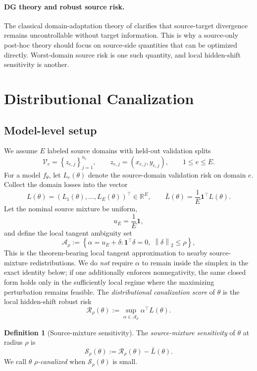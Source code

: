 \documentclass{article}
\theoremstyle{definition}
\newtheorem{definition}[theorem]{Definition}
\newcommand{\RR}{\mathbb{R}}
\newcommand{\cA}{\mathcal{A}}
\newcommand{\cV}{\mathcal{V}}
\newcommand{\one}{\mathbf{1}}
\newcommand{\norm}[1]{\left\lVert #1 \right\rVert}
\newcommand{\paren}[1]{\left( #1 \right)}
\newcommand{\braces}[1]{\left\{ #1 \right\}}
\newcommand{\ub}{u_E}
\begin{document}
\paragraph{DG theory and robust source risk.}
The classical domain-adaptation theory of \citet{ben2010theory} clarifies that source-target divergence remains uncontrollable without target information. This is why a source-only post-hoc theory should focus on source-side quantities that can be optimized directly. Worst-domain source risk is one such quantity, and local hidden-shift sensitivity is another.

\section{Distributional Canalization}
\label{sec:canalization}

\subsection{Model-level setup}

We assume \(E\) labeled source domains with held-out validation splits
\[
\cV_e = \braces{z_{e,j}}_{j=1}^{n_e},
\qquad
z_{e,j}=(x_{e,j}, y_{e,j}),
\qquad
1 \le e \le E.
\]
For a model \(f_\theta\), let \(L_e(\theta)\) denote the source-domain validation risk on domain \(e\). Collect the domain losses into the vector
\[
L(\theta) = \paren{L_1(\theta),\dots,L_E(\theta)}^\top \in \RR^E,
\qquad
\bar L(\theta)=\frac{1}{E}\one^\top L(\theta).
\]
Let the nominal source mixture be uniform,
\[
\ub = \frac{1}{E}\one,
\]
and define the local tangent ambiguity set
\begin{equation}
\cA_\rho
:=
\braces{
\alpha=\ub+\delta :
\one^\top\delta=0,
\;
\norm{\delta}_2 \le \rho
},
\label{eq:ambiguity}
\end{equation}
This is the theorem-bearing local tangent approximation to nearby source-mixture redistributions. We do \emph{not} require \(\alpha\) to remain inside the simplex in the exact identity below; if one additionally enforces nonnegativity, the same closed form holds only in the sufficiently local regime where the maximizing perturbation remains feasible.
The \emph{distributional canalization score} of \(\theta\) is the local hidden-shift robust risk
\begin{equation}
\mathcal R_\rho(\theta)
:=
\sup_{\alpha\in \cA_\rho}
\alpha^\top L(\theta).
\label{eq:model_robust_risk}
\end{equation}

\begin{definition}[Source-mixture sensitivity]
\label{def:sensitivity}
The \emph{source-mixture sensitivity} of \(\theta\) at radius \(\rho\) is
\begin{equation}
\mathcal S_\rho(\theta)
:=
\mathcal R_\rho(\theta)-\bar L(\theta).
\label{eq:sensitivity}
\end{equation}
We call \(\theta\) \emph{\(\rho\)-canalized} when \(\mathcal S_\rho(\theta)\) is small.
\end{definition}
\end{document}
